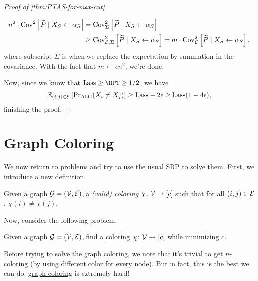 \begin{proof}[Proof of \autoref{thm:PTAS-for-max-cut}]
\begin{explanation}
\[\begin{split}
				n^2\cdot \mathop{\mathrm{Cov}}\nolimits_{}^2\left[\widetilde{P} \mid X_S \gets \alpha _S \right]
				&= \mathop{\mathrm{Cov}}\nolimits_{\Sigma }^2\left[\widetilde{P} \mid X_S\gets \alpha _S \right] \\
				&\geq \mathop{\mathrm{Cov}}\nolimits_{\mathcal{\MakeUppercase{e}} , \Sigma }^2\left[\widetilde{P} \mid X_S\gets \alpha _S \right]
				= m \cdot \mathop{\mathrm{Cov}}\nolimits_{\mathcal{\MakeUppercase{e}} }^2\left[\widetilde{P} \mid X_S \gets \alpha _S \right],
			\end{split}
		\]
		where subscript \(\Sigma \) is when we replace the expectation by summation in the covariance. With the fact that \(m\gets \epsilon n^2\), we're done.
	\end{explanation}
	Now, since we know that \(\mathrm{Lass} \geq \OPT \geq 1 / 2\), we have
	\[
		\mathbb{E}_{(i, j)\in \mathcal{\MakeUppercase{e}} }\left[ \Pr\nolimits_{\mathrm{ALG}}(X_i \neq X_j) \right]
		\geq \mathrm{Lass} - 2 \epsilon \geq \mathrm{Lass}(1 - 4 \epsilon ),
	\]
	finishing the proof.
\end{proof}

\section{Graph Coloring}
We now return to problems and try to use the usual \hyperref[def:SDP]{SDP} to solve them. First, we introduce a new definition.

\begin{definition}[Coloring]\label{def:coloring}
	Given a graph \(\mathcal{\MakeUppercase{g}} =(\mathcal{\MakeUppercase{v}} , \mathcal{\MakeUppercase{e}} )\), a \emph{(valid) coloring} \(\chi \colon \mathcal{\MakeUppercase{v}} \to [c]\) such that for all \((i, j)\in \mathcal{\MakeUppercase{e}} \), \(\chi (i) \neq \chi (j)\).
\end{definition}

Now, consider the following problem.

\begin{problem}\label{prb:graph-coloring}
Given a graph \(\mathcal{\MakeUppercase{g}} =(\mathcal{\MakeUppercase{v}} , \mathcal{\MakeUppercase{e}} )\), find a \hyperref[def:coloring]{coloring} \(\chi \colon \mathcal{\MakeUppercase{v}} \to [c]\) while minimizing \(c\).
\end{problem}

Before trying to solve the \hyperref[prb:graph-coloring]{graph coloring}, we note that it's trivial to get \(n\)-\hyperref[def:coloring]{coloring} (by using different color for every node). But in fact, this is the best we can do: \hyperref[prb:graph-coloring]{graph coloring} is extremely hard!

